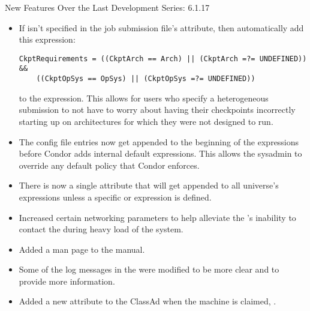 \noindent New Features Over the Last Development Series: 6.1.17
\begin{itemize}

\item If  isn't specified in the job submission file's
 attribute, then automatically add this expression:

\begin{verbatim}
CkptRequirements = ((CkptArch == Arch) || (CkptArch =?= UNDEFINED)) &&
	((CkptOpSys == OpSys) || (CkptOpSys =?= UNDEFINED))
\end{verbatim}

to the  expression. This allows for users who specify
a heterogeneous submission to not have to worry about having their checkpoints
incorrectly starting up on architectures for which they were not designed
to run.

\item The  config file entries now get
appended to the beginning of the expressions before Condor adds internal
default expressions.  This allows the sysadmin to override any default
policy that Condor enforces.

\item There is now a single  attribute
that will get appended to all universe's 
expressions unless a specific  or
 expression is defined.

\item Increased certain networking parameters to help alleviate the 
's inability to contact the  during heavy load
of the system.

\item Added a  man page to the manual.

\item Some of the log messages in the  were modified to
be more clear and to provide more information.

\item Added a new attribute to the  ClassAd when the
machine is claimed, .

\end{itemize}

